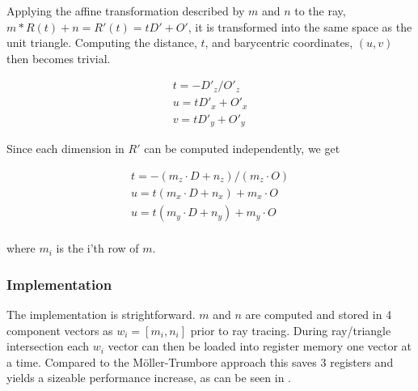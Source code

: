 

Applying the affine transformation described by $m$ and $n$ to the
ray, $m * R(t) + n = R'(t) = tD' + O'$, it is transformed into the
same space as the unit triangle. Computing the distance, $t$, and
barycentric coordinates, $(u,v)$ then becomes trivial.

\begin{displaymath}
  \begin{array}{l}
    t = - D'_z / O'_z \\
    u = t D'_x + O'_x \\
    v = t D'_y + O'_y
  \end{array}
\end{displaymath}

Since each dimension in $R'$ can be computed independently, we get 

\begin{displaymath}
  \begin{array}{l}
    t = - (m_z \cdot D + n_z) / (m_z \cdot O) \\
    u = t (m_x \cdot D + n_x) + m_x \cdot O \\
    u = t (m_y \cdot D + n_y) + m_y \cdot O \\
  \end{array}
\end{displaymath}

where $m_i$ is the i'th row of $m$.

\subsubsection{Implementation}

The implementation is strightforward. $m$ and $n$ are computed and
stored in 4 component vectors as $w_i = \left[m_i, n_i \right]$ prior
to ray tracing. During ray/triangle intersection each $w_i$ vector can
then be loaded into register memory one vector at a time. Compared to
the Möller-Trumbore approach this saves 3 registers and yields a
sizeable performance increase, as can be seen in . 

